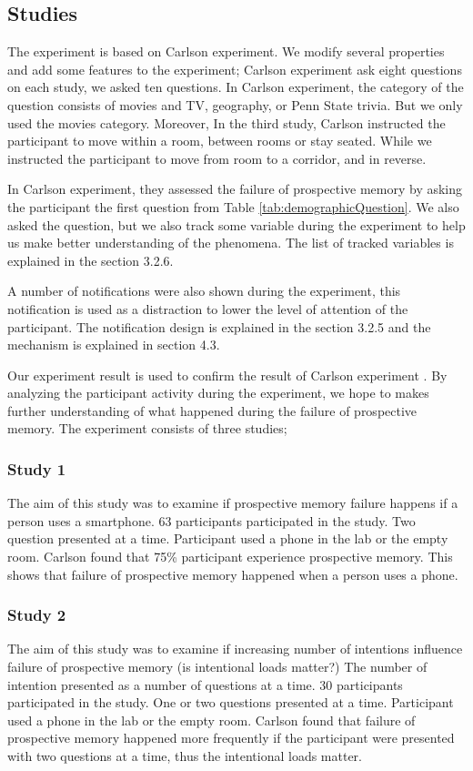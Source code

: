 \subsection{Studies}
The experiment is based on Carlson experiment. We modify several properties and add some features to the experiment;
Carlson experiment ask eight questions on each study, we asked ten questions.
In Carlson experiment, the category of the question consists of movies and TV,
geography, or Penn State trivia. But we only used the movies category.
Moreover, In the third study, Carlson instructed the participant to move within a room, between rooms or stay seated.
While we instructed the participant to move from room to a corridor, and in reverse.

In Carlson experiment, they assessed the failure of prospective memory by asking the participant the first question
from Table \ref{tab:demographicQuestion}. We also asked the question, but we also track some variable during the experiment to help us make better
 understanding of the phenomena. The list of tracked variables is explained in the section 3.2.6.

A number of notifications were also shown during the experiment, this notification is used as a distraction to lower the level of attention
of the participant. The notification design is explained in the section 3.2.5 and the mechanism
is explained in section 4.3.


Our experiment result is used to confirm the result of Carlson experiment
. By analyzing the participant activity during the experiment, we hope to makes
further understanding of what happened during the failure of prospective memory.
 The experiment consists of three studies;

\subsubsection{Study 1}
The aim of this study was to examine if prospective memory failure happens if a person uses a smartphone.
63 participants participated in the study.
Two question presented at a time. Participant used a phone in the lab or the empty room.
Carlson found that 75\% participant experience prospective memory.
This shows that failure of prospective memory happened when a person uses a phone.

\subsubsection{Study 2}
The aim of this study was to examine if increasing number of intentions influence failure of prospective memory (is intentional loads matter?)
The number of intention presented as a number of questions at a time.
30 participants participated in the study.
One or two questions presented at a time.
Participant used a phone in the lab or the empty room.
Carlson found that failure of prospective memory happened more frequently if the participant were
presented with two questions at a time, thus the intentional loads matter.


